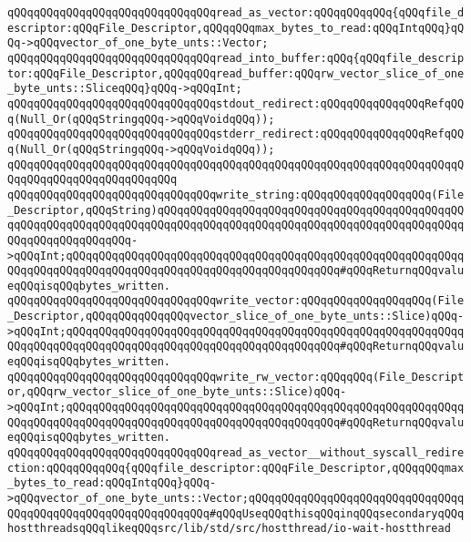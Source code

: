 \newline
\verb|qQQqqQQqqQQqqQQqqQQqqQQqqQQqqQQqread_as_vector:qQQqqQQqqQQq{qQQqfile_descriptor:qQQqFile_Descriptor,qQQqqQQqmax_bytes_to_read:qQQqIntqQQq}qQQq->qQQqvector_of_one_byte_unts::Vector;|\newline
\verb|qQQqqQQqqQQqqQQqqQQqqQQqqQQqqQQqread_into_buffer:qQQq{qQQqfile_descriptor:qQQqFile_Descriptor,qQQqqQQqread_buffer:qQQqrw_vector_slice_of_one_byte_unts::SliceqQQq}qQQq->qQQqInt;|\newline
\newline
\verb|qQQqqQQqqQQqqQQqqQQqqQQqqQQqqQQqstdout_redirect:qQQqqQQqqQQqqQQqRefqQQq(Null_Or(qQQqStringqQQq->qQQqVoidqQQq));|\newline
\verb|qQQqqQQqqQQqqQQqqQQqqQQqqQQqqQQqstderr_redirect:qQQqqQQqqQQqqQQqRefqQQq(Null_Or(qQQqStringqQQq->qQQqVoidqQQq));|\newline
\verb|qQQqqQQqqQQqqQQqqQQqqQQqqQQqqQQqqQQqqQQqqQQqqQQqqQQqqQQqqQQqqQQqqQQqqQQqqQQqqQQqqQQqqQQqqQQqqQQq|\newline
\verb|qQQqqQQqqQQqqQQqqQQqqQQqqQQqqQQqwrite_string:qQQqqQQqqQQqqQQqqQQq(File_Descriptor,qQQqString)qQQqqQQqqQQqqQQqqQQqqQQqqQQqqQQqqQQqqQQqqQQqqQQqqQQqqQQqqQQqqQQqqQQqqQQqqQQqqQQqqQQqqQQqqQQqqQQqqQQqqQQqqQQqqQQqqQQqqQQqqQQqqQQqqQQqqQQq->qQQqInt;qQQqqQQqqQQqqQQqqQQqqQQqqQQqqQQqqQQqqQQqqQQqqQQqqQQqqQQqqQQqqQQqqQQqqQQqqQQqqQQqqQQqqQQqqQQqqQQqqQQqqQQqqQQqqQQq#qQQqReturnqQQqvalueqQQqisqQQqbytes_written.|\newline
\verb|qQQqqQQqqQQqqQQqqQQqqQQqqQQqqQQqwrite_vector:qQQqqQQqqQQqqQQqqQQq(File_Descriptor,qQQqqQQqqQQqqQQqvector_slice_of_one_byte_unts::Slice)qQQq->qQQqInt;qQQqqQQqqQQqqQQqqQQqqQQqqQQqqQQqqQQqqQQqqQQqqQQqqQQqqQQqqQQqqQQqqQQqqQQqqQQqqQQqqQQqqQQqqQQqqQQqqQQqqQQqqQQqqQQq#qQQqReturnqQQqvalueqQQqisqQQqbytes_written.|\newline
\verb|qQQqqQQqqQQqqQQqqQQqqQQqqQQqqQQqwrite_rw_vector:qQQqqQQq(File_Descriptor,qQQqrw_vector_slice_of_one_byte_unts::Slice)qQQq->qQQqInt;qQQqqQQqqQQqqQQqqQQqqQQqqQQqqQQqqQQqqQQqqQQqqQQqqQQqqQQqqQQqqQQqqQQqqQQqqQQqqQQqqQQqqQQqqQQqqQQqqQQqqQQqqQQqqQQq#qQQqReturnqQQqvalueqQQqisqQQqbytes_written.|\newline
\newline
\newline
\newline
\verb|qQQqqQQqqQQqqQQqqQQqqQQqqQQqqQQqread_as_vector__without_syscall_redirection:qQQqqQQqqQQq{qQQqfile_descriptor:qQQqFile_Descriptor,qQQqqQQqmax_bytes_to_read:qQQqIntqQQq}qQQq->qQQqvector_of_one_byte_unts::Vector;qQQqqQQqqQQqqQQqqQQqqQQqqQQqqQQqqQQqqQQqqQQqqQQqqQQqqQQqqQQqqQQq#qQQqUseqQQqthisqQQqinqQQqsecondaryqQQqhostthreadsqQQqlikeqQQqsrc/lib/std/src/hostthread/io-wait-hostthread|\newline
